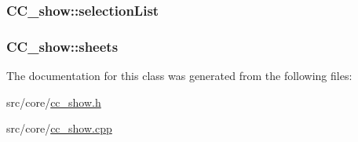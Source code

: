 \hypertarget{a00046_af4e9d7b79816a9180dc4e45a335111e1}{
\subsubsection[{selection\-List}]{ C\-C\-\_\-show\-::selection\-List\hspace{0.3cm}{\ttfamily [private]}}}\label{a00046_af4e9d7b79816a9180dc4e45a335111e1}
\hypertarget{a00046_aba122ad0e7f777f7a643530a10b09c2c}{
\subsubsection[{sheets}]{ C\-C\-\_\-show\-::sheets\hspace{0.3cm}{\ttfamily [private]}}}\label{a00046_aba122ad0e7f777f7a643530a10b09c2c}


The documentation for this class was generated from the following files\-:\begin{DoxyCompactItemize}
\item 
src/core/\hyperlink{a00214}{cc\-\_\-show.\-h}\item 
src/core/\hyperlink{a00213}{cc\-\_\-show.\-cpp}\end{DoxyCompactItemize}
